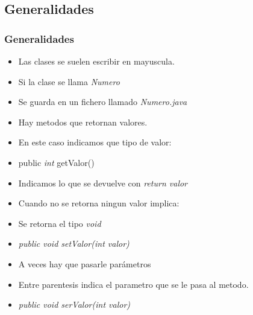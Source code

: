 \documentclass{beamer}
\begin{document}
\subsection{Generalidades}
\begin{frame}
    \frametitle{Generalidades}
\begin{itemize}[<+->]
\item Las clases se suelen escribir en mayuscula.
\item Si la clase se llama \emph{Numero}
\item Se guarda en un fichero llamado \emph{Numero.java}
\item Hay metodos que retornan valores.
\item En este caso indicamos que tipo de valor:
\item public \emph{int} getValor()
\item Indicamos lo que se devuelve con \emph{return valor}
\item Cuando no se retorna ningun valor implica:
\item Se retorna el tipo \emph{void}
\item \emph{public \emph{void} setValor(int valor)} 
\item A veces hay que pasarle parámetros
\item Entre parentesis indica el parametro que se le pasa al metodo.
\item \emph{public void serValor(int valor)}
\end{itemize}
\pause
\end{frame}
\end{document}
